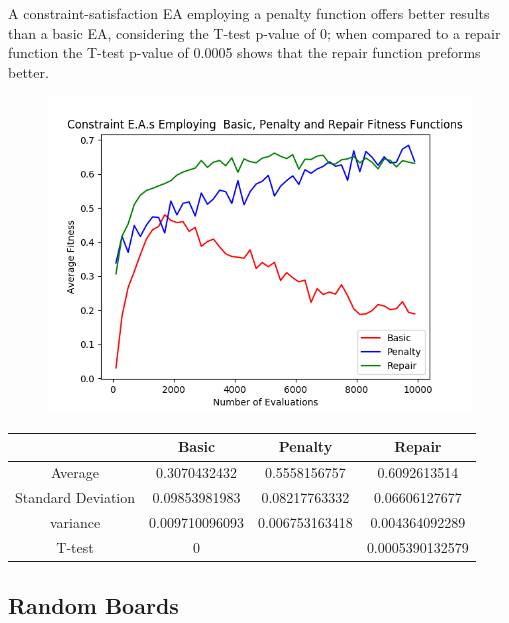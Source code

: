 \documentclass{article}
\begin{document}
		A constraint-satisfaction EA employing a penalty function offers better results than a basic EA, 
		considering the T-test p-value  of 0; when compared to a repair function the T-test p-value of 0.0005 shows that 	the repair function preforms better.
		\begin{figure}[!htb]
		\centering
		\includegraphics[scale=0.4]{q1_assigned_board_penalty_vs_basic_vs_repair.png}
		\end{figure}
		
		\begin{center}
		\begin{tabular}{ || c | c | c | c ||}
		\hline
		       & Basic & Penalty & Repair \\ 
		 \hline\hline
		 Average & 0.3070432432	& 0.5558156757 & 0.6092613514 \\ 
		 \hline
		 Standard Deviation &	0.09853981983 &	0.08217763332 &	0.06606127677 \\
		 \hline
		 variance &	0.009710096093 &	0.006753163418 &	0.004364092289 \\
		 \hline
		 T-test &	0	& &	0.0005390132579 \\
		 \hline
		\end{tabular}
		\end{center}
		
		\subsection{Random Boards}
\end{document}
